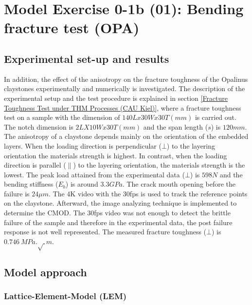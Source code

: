 \section{Model Exercise 0-1b (01): Bending fracture test (OPA)}
\label{sec:mex01b}

\subsection{Experimental set-up and results}

In addition, the effect of the anisotropy on the fracture toughness of the Opalinus claystones experimentally and numerically is investigated. The description of the experimental setup and the test procedure is explained in section \ref{Fracture Toughness Test under THM Processes (CAU Kiel)}, where a fracture toughness test on a sample with the dimension of $140Lx30Wx30T (mm)$ is carried out. The notch dimension is $2LX10Wx30T (mm)$ and the span length ($s$) is $120 mm$. The anisotropy of a claystone depends mainly on the orientation of the embedded layers. When the loading direction is perpendicular ($\bot$) to the layering orientation the materials strength is highest. In contrast, when the loading direction is parallel ($\parallel$) to the layering orientation, the materials strength is the lowest. The peak load attained from the experimental data ($\bot$) is $598 N$ and the bending stiffness ($E_b$) is around $3.3 GPa$. The crack mouth opening before the failure is $24 \mu m$. The 4K video with the 30fps is used to track the reference points on the claystone. Afterward, the image analyzing technique is implemented to determine the CMOD. The 30fps video was not enough to detect the brittle failure of the sample and therefore in the experimental data, the post failure response is not well represented. The measured fracture toughness ($\bot$) is $0.746\ MPa.\sqrt\ m$.

\subsection{Model approach}

\subsubsection*{Lattice-Element-Model (LEM)}

